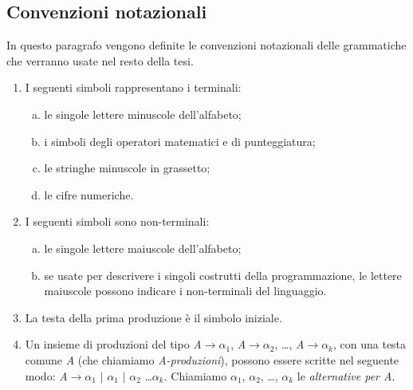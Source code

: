 \subsection{Convenzioni notazionali}
In questo paragrafo vengono definite le convenzioni notazionali delle grammatiche che verranno usate nel resto della tesi.
\begin{enumerate}
	\item I seguenti simboli rappresentano i terminali:
	\begin{enumerate}[(a)]
		\item le singole lettere minuscole dell'alfabeto;
		\item i simboli degli operatori matematici e di punteggiatura;
		\item le stringhe minuscole in grassetto;
		\item le cifre numeriche.
	\end{enumerate}
	\item I seguenti simboli sono non-terminali:
	\begin{enumerate}[(a)]
		\item le singole lettere maiuscole dell'alfabeto;  
		\item se usate per descrivere i singoli costrutti della programmazione, le lettere maiuscole possono indicare i non-terminali del linguaggio.
	\end{enumerate}
	\item La testa della prima produzione è il simbolo iniziale.
	\item Un insieme di produzioni del tipo \textit{A$\to$$\alpha_{1}$}, \textit{A$\to$$\alpha_{2}$}, \dots, \textit{A$\to$$\alpha_{k}$}, con una testa comune \textit{A} (che chiamiamo \textit{A-produzioni}), 
	possono essere scritte nel seguente modo: \textit{A}$\to$$\alpha_{1}$ 
	$\mid$ $\alpha_{1}$ $\mid$ $\alpha_{2}$ \dots $\alpha_{k}$. Chiamiamo $\alpha_{1}$, $\alpha_{2}$, \dots , $\alpha_{k}$ le \textit{alternative per A}.
\end{enumerate} 
